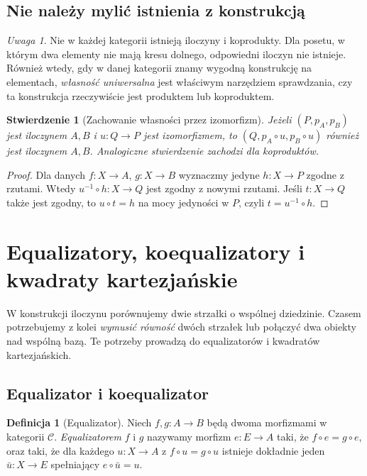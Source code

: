 \documentclass[11pt,a4paper]{article}
\numberwithin{equation}{section}
\theoremstyle{plain}
\newtheorem{stwierdzenie}[twierdzenie]{Stwierdzenie}
\theoremstyle{definition}
\newtheorem{definicja}[twierdzenie]{Definicja}
\theoremstyle{remark}
\newtheorem{uwaga}[twierdzenie]{Uwaga}
\begin{document}
\subsection{Nie należy mylić istnienia z konstrukcją}

\begin{uwaga}
Nie w każdej kategorii istnieją iloczyny i koprodukty. Dla posetu, w którym dwa elementy nie mają kresu dolnego, odpowiedni iloczyn nie istnieje. Również wtedy, gdy w danej kategorii znamy wygodną konstrukcję na elementach, \emph{własność uniwersalna} jest właściwym narzędziem sprawdzania, czy ta konstrukcja rzeczywiście jest produktem lub koproduktem.
\end{uwaga}

\begin{stwierdzenie}[Zachowanie własności przez izomorfizm]
Jeżeli $(P,p_A,p_B)$ jest iloczynem $A,B$ i $u:Q\to P$ jest izomorfizmem, to $(Q,p_A\circ u,p_B\circ u)$ również jest iloczynem $A,B$. Analogiczne stwierdzenie zachodzi dla koproduktów.
\end{stwierdzenie}
\begin{proof}
Dla danych $f:X\to A$, $g:X\to B$ wyznaczmy jedyne $h:X\to P$ zgodne z rzutami. Wtedy $u^{-1}\circ h:X\to Q$ jest zgodny z nowymi rzutami. Jeśli $t:X\to Q$ także jest zgodny, to $u\circ t=h$ na mocy jedyności w $P$, czyli $t=u^{-1}\circ h$.
\end{proof}

\section{Equalizatory, koequalizatory i kwadraty kartezjańskie}\label{sec:equalizatory}

W konstrukcji iloczynu porównujemy dwie strzałki o wspólnej dziedzinie. Czasem potrzebujemy z kolei \emph{wymusić równość} dwóch strzałek lub połączyć dwa obiekty nad wspólną bazą. Te potrzeby prowadzą do equalizatorów i kwadratów kartezjańskich.

\subsection{Equalizator i koequalizator}

\begin{definicja}[Equalizator]\label{def:equalizer}
Niech $f,g:A\to B$ będą dwoma morfizmami w kategorii $\mathcal C$. \emph{Equalizatorem} $f$ i $g$ nazywamy morfizm $e:E\to A$ taki, że $f\circ e=g\circ e$, oraz taki, że dla każdego $u:X\to A$ z $f\circ u=g\circ u$ istnieje dokładnie jeden $\bar u:X\to E$ spełniający $e\circ\bar u=u$.
\end{definicja}
\end{document}
